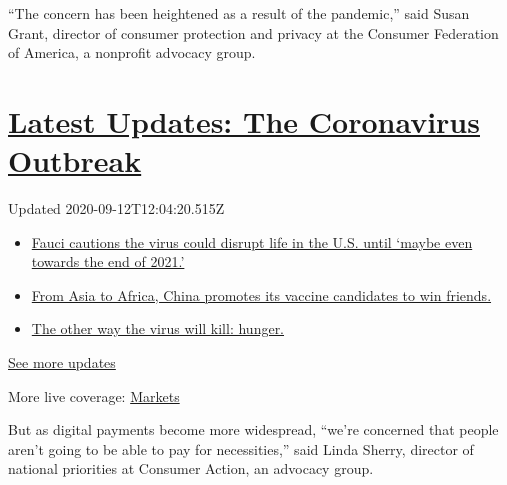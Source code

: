 ``The concern has been heightened as a result of the pandemic,'' said
Susan Grant, director of consumer protection and privacy at the Consumer
Federation of America, a nonprofit advocacy group.

\hypertarget{latest-updates-the-coronavirus-outbreak}{%
\section{\texorpdfstring{\href{https://www.nytimes3xbfgragh.onion/2020/09/11/world/covid-19-coronavirus.html?action=click\&pgtype=Article\&state=default\&region=MAIN_CONTENT_1\&context=storylines_live_updates}{Latest
Updates: The Coronavirus
Outbreak}}{Latest Updates: The Coronavirus Outbreak}}\label{latest-updates-the-coronavirus-outbreak}}

Updated 2020-09-12T12:04:20.515Z

\begin{itemize}
\tightlist
\item
  \href{https://www.nytimes3xbfgragh.onion/2020/09/11/world/covid-19-coronavirus.html?action=click\&pgtype=Article\&state=default\&region=MAIN_CONTENT_1\&context=storylines_live_updates\#link-dfb8a16}{Fauci
  cautions the virus could disrupt life in the U.S. until `maybe even
  towards the end of 2021.'}
\item
  \href{https://www.nytimes3xbfgragh.onion/2020/09/11/world/covid-19-coronavirus.html?action=click\&pgtype=Article\&state=default\&region=MAIN_CONTENT_1\&context=storylines_live_updates\#link-7104d154}{From
  Asia to Africa, China promotes its vaccine candidates to win friends.}
\item
  \href{https://www.nytimes3xbfgragh.onion/2020/09/11/world/covid-19-coronavirus.html?action=click\&pgtype=Article\&state=default\&region=MAIN_CONTENT_1\&context=storylines_live_updates\#link-393ad215}{The
  other way the virus will kill: hunger.}
\end{itemize}

\href{https://www.nytimes3xbfgragh.onion/2020/09/11/world/covid-19-coronavirus.html?action=click\&pgtype=Article\&state=default\&region=MAIN_CONTENT_1\&context=storylines_live_updates}{See
more updates}

More live coverage:
\href{https://www.nytimes3xbfgragh.onion/live/2020/09/11/business/stock-market-today-coronavirus?action=click\&pgtype=Article\&state=default\&region=MAIN_CONTENT_1\&context=storylines_live_updates}{Markets}

But as digital payments become more widespread, ``we're concerned that
people aren't going to be able to pay for necessities,'' said Linda
Sherry, director of national priorities at Consumer Action, an advocacy
group.


